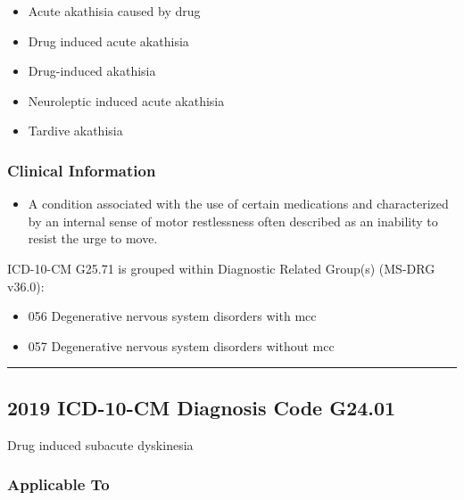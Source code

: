 \begin{paracol}{2}
\begin{leftcolumn}
\begin{itemize}
\tightlist
\item
  Acute akathisia caused by drug
\item
  Drug induced acute akathisia
\item
  Drug-induced akathisia
\item
  Neuroleptic induced acute akathisia
\item
  Tardive akathisia
\end{itemize}

\hypertarget{clinical-information}{%
\subsubsection{Clinical Information}\label{clinical-information}}

\begin{itemize}
\tightlist
\item
  A condition associated with the use of certain medications and characterized by an internal sense of motor restlessness often described as an inability to resist the urge to move.
\end{itemize}

\noindent ICD-10-CM G25.71 is grouped within Diagnostic Related Group(s) (MS-DRG v36.0):

\begin{itemize}
\tightlist
\item
  056 Degenerative nervous system disorders with mcc
\item
  057 Degenerative nervous system disorders without mcc
\end{itemize}

\begin{center}\rule{0.5\linewidth}{\linethickness}\end{center}

\hypertarget{icd-10-cm-diagnosis-code-g24.01}{%
\subsection{2019 ICD-10-CM Diagnosis Code G24.01}\label{icd-10-cm-diagnosis-code-g24.01}}

\noindent Drug induced subacute dyskinesia

\hypertarget{applicable-to-2}{%
\subsubsection{Applicable To}\label{applicable-to-2}}


\end{leftcolumn}
\end{paracol}
